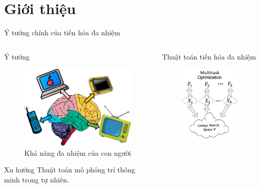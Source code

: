 \section{Giới thiệu}

\begin{frame}{Ý tưởng chính của tiến hóa đa nhiệm}
    \begin{columns}
        \begin{column}{0.45\textwidth}
            \begin{block}{Ý tưởng}
                \begin{figure}
                    \centering
                    \includegraphics[width=0.7\linewidth]{figure/introduction/cognitive_multitasking.png}
                    \caption{Khả năng đa nhiệm của con người}
                    \label{fig:introduction:human_multitask}
                \end{figure}
            \end{block}
            \begin{block}{Xu hướng}
                Thuật toán mô phỏng trí thông minh trong tự nhiên.
            \end{block}
        \end{column}
        \begin{column}{0.5\textwidth}  %
            \begin{block}{Thuật toán tiến hóa đa nhiệm}
                \begin{figure}
                    \centering
                    \includegraphics[width=0.5\linewidth]{figure/introduction/mto.png}

\end{figure}
\end{block}
\end{column}
\end{columns}
\end{frame}
